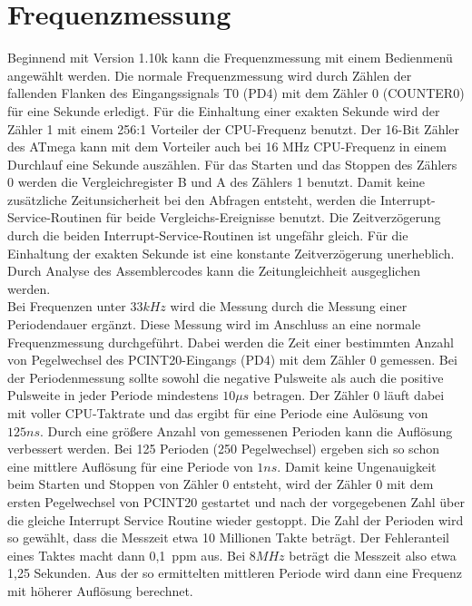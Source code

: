 
\section{Frequenzmessung}
\label{sec:frequency}

Beginnend mit Version 1.10k kann die Frequenzmessung mit einem Bedienmenü angewählt werden.
Die normale Frequenzmessung wird durch Zählen der fallenden Flanken des Eingangssignals T0 (PD4)
mit dem Zähler 0 (COUNTER0) für eine Sekunde erledigt. Für die Einhaltung einer exakten Sekunde
wird der Zähler 1 mit einem 256:1 Vorteiler der CPU-Frequenz benutzt. Der 16-Bit Zähler des ATmega
kann mit dem Vorteiler auch bei 16 MHz CPU-Frequenz in einem Durchlauf eine Sekunde auszählen.
Für das Starten und das Stoppen des Zählers 0 werden die Vergleichregister B und A des Zählers 1
benutzt. Damit keine zusätzliche Zeitunsicherheit bei den Abfragen entsteht, werden die
Interrupt-Service-Routinen für beide Vergleichs-Ereignisse benutzt.
Die Zeitverzögerung durch die beiden Interrupt-Service-Routinen ist ungefähr gleich.
Für die Einhaltung der exakten Sekunde ist eine konstante Zeitverzögerung unerheblich.
Durch Analyse des Assemblercodes kann die Zeitungleichheit ausgeglichen werden.\\

Bei Frequenzen unter \(33kHz\) wird die Messung durch die Messung einer Periodendauer
ergänzt. Diese Messung wird im Anschluss an eine normale Frequenzmessung durchgeführt.
Dabei werden die Zeit einer bestimmten Anzahl von Pegelwechsel des PCINT20-Eingangs (PD4) 
mit dem Zähler 0 gemessen. 
Bei der Periodenmessung sollte sowohl die negative Pulsweite als auch die positive Pulsweite
in jeder Periode mindestens \(10\mu s\) betragen.
Der Zähler 0 läuft dabei mit voller CPU-Taktrate und das ergibt für eine Periode eine
Aulösung von \(125ns\). Durch eine größere Anzahl von gemessenen Perioden kann die Auflösung
verbessert werden. Bei 125 Perioden (250 Pegelwechsel) ergeben sich so schon eine mittlere
Auflösung für eine Periode von \(1ns\). Damit keine Ungenauigkeit beim Starten und
Stoppen von Zähler 0 entsteht, wird der Zähler 0 mit dem ersten Pegelwechsel von
PCINT20 gestartet und nach der vorgegebenen Zahl über die gleiche Interrupt Service Routine
wieder gestoppt.
Die Zahl der Perioden wird so gewählt, dass die Messzeit etwa 10 Millionen Takte beträgt.
Der Fehleranteil eines Taktes macht dann 0,1~ppm aus.
Bei \(8MHz\) beträgt die Messzeit also etwa 1,25 Sekunden.
Aus der so ermittelten mittleren Periode wird dann eine Frequenz mit höherer Auflösung berechnet.

